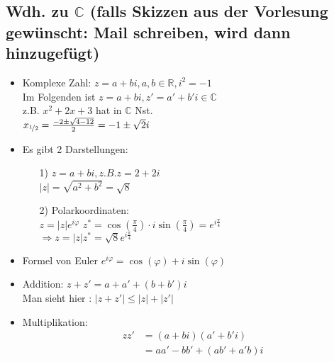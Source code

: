 \documentclass[12pt,titlepage, pdf]{article}
\newcommand{\R}{\mathds{R}}
\newcommand{\C}{\mathds{C}}
\renewcommand{\>}{\rightarrow}
\renewcommand{\*}{\cdot}
\renewcommand{\phi}{\varphi}
\begin{document}
		      			\subsection*{Wdh. zu $\C$ (falls Skizzen aus der Vorlesung gewünscht: Mail schreiben, wird dann hinzugefügt)}
		      			\begin{itemize}
		      				\item Komplexe Zahl: $z = a +bi, a,b \in \R, i^2 = -1$\\
		      				      Im Folgenden ist $z = a +bi, z' = a' + b'i \in \C$\\
		      				      z.B. $x^2 + 2x +3$ hat in $\C$ Nst.\\
		      				      $x_{\nicefrac{1}{2}} = \frac{-2 \pm \sqrt{4-12}}{2} = -1 \pm \sqrt{2}i$\\
		      				\item Es gibt 2 Darstellungen: \\		
		      				      \begin{itemize}
		      				      	\item[1)]
		      				      	      $z = a +bi, z.B. z = 2 + 2i$\\
		      				      	      $|z| = \sqrt{a^2 + b^2} = \sqrt{8}$
		      				      	\item[2)]
		      				      	      Polarkoordinaten: \\
		      				      	      $z = |z| e^{i\phi}$
		      				      	      $z^* = \cos(\frac{\pi}{4}) \cdot i \sin(\frac{\pi}{4}) = e^{i\frac{\pi}{4}}$ \\
		      				      	      $\Rightarrow z = |z| z^* = \sqrt{8} e^{i\frac{\pi}{4}}$
		      				      \end{itemize} 
		      				\item Formel von Euler $e^{i\phi} = \cos(\phi) + i \sin(\phi)$
		      				\item Addition: $z + z' = a +a' + (b+ b')i$ \\
		      				      Man sieht hier : $ |z + z'| \leq |z| + |z'|$
		      				\item Multiplikation: 
		      				      \begin{align*}
		      				      	zz' & = (a + bi)(a'+b'i)             \\
		      				      	    & = aa' - bb'+(ab'+a'b)i         \\

\end{align*}
\end{itemize}
\end{document}
